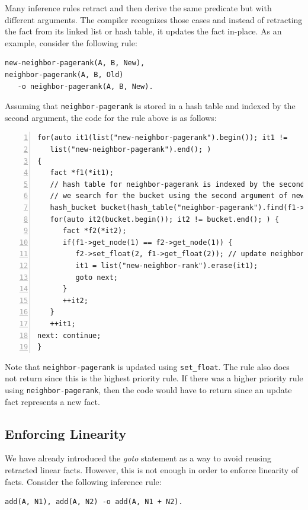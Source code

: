 Many inference rules retract and then derive the same predicate but with
different arguments. The compiler recognizes those cases and instead of
retracting the fact from its linked list or hash table, it updates the fact
in-place. As an example, consider the following rule:

\begin{Verbatim}[fontsize=\scriptsize]
new-neighbor-pagerank(A, B, New),
neighbor-pagerank(A, B, Old)
   -o neighbor-pagerank(A, B, New).
\end{Verbatim}

Assuming that \texttt{neighbor-pagerank} is stored in a hash table and indexed
by the second argument, the code for the rule above is as follows:

\begin{Verbatim}[numbers=left,fontsize=\scriptsize,xleftmargin=\codemargin]
for(auto it1(list("new-neighbor-pagerank").begin()); it1 !=
   list("new-neighbor-pagerank").end(); )
{
   fact *f1(*it1);
   // hash table for neighbor-pagerank is indexed by the second argument therefore
   // we search for the bucket using the second argument of new-neighbor-pagerank
   hash_bucket bucket(hash_table("neighbor-pagerank").find(f1->get_node(1));
   for(auto it2(bucket.begin()); it2 != bucket.end(); ) {
      fact *f2(*it2);
      if(f1->get_node(1) == f2->get_node(1)) {
         f2->set_float(2, f1->get_float(2)); // update neighbor-pagerank
         it1 = list("new-neighbor-rank").erase(it1);
         goto next;
      }
      ++it2;
   }
   ++it1;
next: continue;
}
\end{Verbatim}

Note that \texttt{neighbor-pagerank} is updated using \texttt{set\_float}. The
rule also does not return since this is the highest priority rule. If there
was a higher priority rule using \texttt{neighbor-pagerank}, then the code
would have to return since an update fact represents a new fact.

\subsection{Enforcing Linearity}

We have already introduced the \emph{goto} statement as a way to avoid reusing
retracted linear facts. However, this is not enough in order to enforce
linearity of facts. Consider the following inference rule:

\begin{Verbatim}[fontsize=\scriptsize]
add(A, N1), add(A, N2) -o add(A, N1 + N2).
\end{Verbatim}

